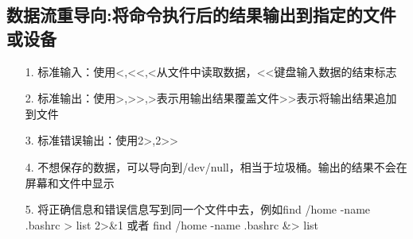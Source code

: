 \documentclass[a4paper,left=1.5cm,right=1.5cm,11pt]{article}
\begin{document}
\subsection{数据流重导向:将命令执行后的结果输出到指定的文件或设备}
\begin{itemize}
	\item[1.]标准输入：使用<,<<,<从文件中读取数据，<<键盘输入数据的结束标志
	\item[2.]标准输出：使用>,>>,>表示用输出结果覆盖文件>>表示将输出结果追加到文件
	\item[3.]标准错误输出：使用2>,2>>
	\item[4.]不想保存的数据，可以导向到/dev/null，相当于垃圾桶。输出的结果不会在屏幕和文件中显示
	\item[5.]将正确信息和错误信息写到同一个文件中去，例如find /home -name .bashrc > list 2>&1 或者 find /home -name .bashrc &> list
\end{itemize}
\end{document}
